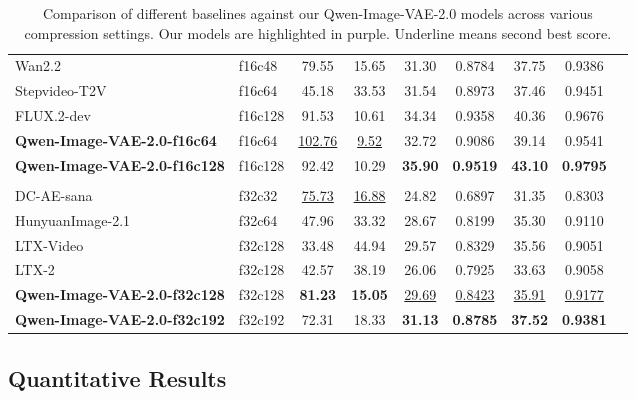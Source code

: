 \documentclass{llmxive}
\begin{document}
\begin{table}[t]
{\begin{tabular}{llccccccc}
Wan2.2~\citep{wan2025wan}           & f16c48   & 79.55  & 15.65 & 31.30 & 0.8784 & 37.75 & 0.9386 \\
Stepvideo-T2V~\citep{stepvideo}    & f16c64   & 45.18  & 33.53 & 31.54 & 0.8973 & 37.46 & 0.9451 \\
FLUX.2-dev~\citep{flux2}       & f16c128  & 91.53  & 10.61 & 34.34 & 0.9358 & 40.36 & 0.9676 \\
\rowcolor{blue!5} \textbf{Qwen-Image-VAE-2.0-f16c64} & f16c64 & \underline{102.76} & \underline{9.52} & 32.72 & 0.9086 & 39.14 & 0.9541 \\
\rowcolor{blue!5} \textbf{Qwen-Image-VAE-2.0-f16c128} & f16c128 & 92.42 & 10.29 & \textbf{35.90} & \textbf{0.9519} & \textbf{43.10} & \textbf{0.9795} \\
\midrule
\rowcolor{gray!8} \multicolumn{8}{l}{\textit{f32 Compression VAEs}} \\
DC-AE-sana~\citep{dcae}        & f32c32   & \underline{75.73}  & \underline{16.88} & 24.82 & 0.6897 & 31.35 & 0.8303 \\
HunyuanImage-2.1~\citep{hunyuanimage2.1} & f32c64   & 47.96  & 33.32 & 28.67 & 0.8199 & 35.30 & 0.9110 \\
LTX-Video~\citep{ltx}            & f32c128  & 33.48  & 44.94 & 29.57 & 0.8329 & 35.56 & 0.9051 \\
LTX-2~\citep{ltx2}            & f32c128  & 42.57  & 38.19 & 26.06 & 0.7925 & 33.63 & 0.9058 \\
\rowcolor{blue!5} \textbf{Qwen-Image-VAE-2.0-f32c128} & f32c128 & \textbf{81.23} & \textbf{15.05} & \underline{29.69} & \underline{0.8423} & \underline{35.91} & \underline{0.9177} \\
\rowcolor{blue!5} \textbf{Qwen-Image-VAE-2.0-f32c192} & f32c192 & 72.31 & 18.33 & \textbf{31.13} & \textbf{0.8785} & \textbf{37.52} & \textbf{0.9381} \\
\bottomrule
\end{tabular}
}
\caption{Comparison of different baselines against our Qwen-Image-VAE-2.0 models across various compression settings. Our models are highlighted in \colorbox{blue!5}{purple}. Underline means second best score.}
\label{tab:main_bench}
\end{table}

\subsection{Quantitative Results}
\end{document}
